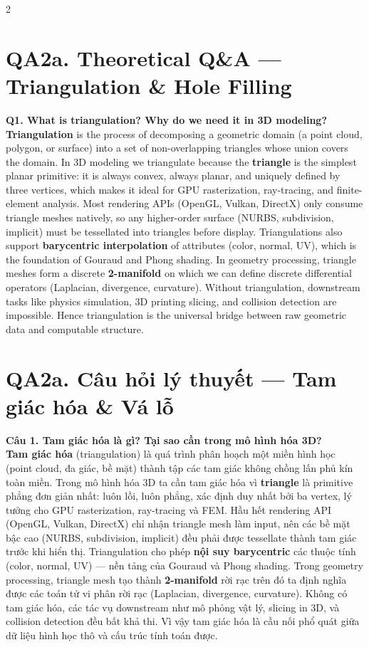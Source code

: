 \begin{paracol}{2}
\section*{QA2a. Theoretical Q\&A — Triangulation \& Hole Filling}

\textbf{Q1. What is triangulation? Why do we need it in 3D modeling?}\\
\textbf{Triangulation} is the process of decomposing a geometric domain (a point cloud, polygon, or surface) into a set of non-overlapping triangles whose union covers the domain. In 3D modeling we triangulate because the \textbf{triangle} is the simplest planar primitive: it is always convex, always planar, and uniquely defined by three vertices, which makes it ideal for GPU rasterization, ray-tracing, and finite-element analysis. Most rendering APIs (OpenGL, Vulkan, DirectX) only consume triangle meshes natively, so any higher-order surface (NURBS, subdivision, implicit) must be tessellated into triangles before display. Triangulations also support \textbf{barycentric interpolation} of attributes (color, normal, UV), which is the foundation of Gouraud and Phong shading. In geometry processing, triangle meshes form a discrete \textbf{2-manifold} on which we can define discrete differential operators (Laplacian, divergence, curvature). Without triangulation, downstream tasks like physics simulation, 3D printing slicing, and collision detection are impossible. Hence triangulation is the universal bridge between raw geometric data and computable structure.

\switchcolumn

\section*{QA2a. Câu hỏi lý thuyết — Tam giác hóa \& Vá lỗ}

\textbf{Câu 1. Tam giác hóa là gì? Tại sao cần trong mô hình hóa 3D?}\\
\textbf{Tam giác hóa} (triangulation) là quá trình phân hoạch một miền hình học (point cloud, đa giác, bề mặt) thành tập các tam giác không chồng lấn phủ kín toàn miền. Trong mô hình hóa 3D ta cần tam giác hóa vì \textbf{triangle} là primitive phẳng đơn giản nhất: luôn lồi, luôn phẳng, xác định duy nhất bởi ba vertex, lý tưởng cho GPU rasterization, ray-tracing và FEM. Hầu hết rendering API (OpenGL, Vulkan, DirectX) chỉ nhận triangle mesh làm input, nên các bề mặt bậc cao (NURBS, subdivision, implicit) đều phải được tessellate thành tam giác trước khi hiển thị. Triangulation cho phép \textbf{nội suy barycentric} các thuộc tính (color, normal, UV) — nền tảng của Gouraud và Phong shading. Trong geometry processing, triangle mesh tạo thành \textbf{2-manifold} rời rạc trên đó ta định nghĩa được các toán tử vi phân rời rạc (Laplacian, divergence, curvature). Không có tam giác hóa, các tác vụ downstream như mô phỏng vật lý, slicing in 3D, và collision detection đều bất khả thi. Vì vậy tam giác hóa là cầu nối phổ quát giữa dữ liệu hình học thô và cấu trúc tính toán được.


\end{paracol}
